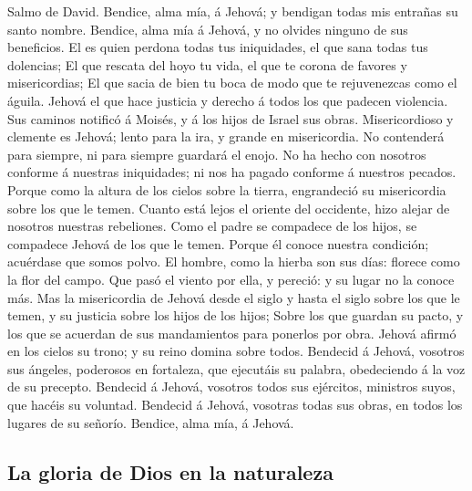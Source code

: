  Salmo de David. Bendice, alma mía, á Jehová; y bendigan
todas mis entrañas su santo nombre.  Bendice, alma mía á
Jehová, y no olvides ninguno de sus beneficios.  El es
quien perdona todas tus iniquidades, el que sana todas tus dolencias;
 El que rescata del hoyo tu vida, el que te corona de
favores y misericordias;  El que sacia de bien tu boca de
modo que te rejuvenezcas como el águila.  Jehová el que
hace justicia y derecho á todos los que padecen violencia.
 Sus caminos notificó á Moisés, y á los hijos de Israel
sus obras.  Misericordioso y clemente es Jehová; lento
para la ira, y grande en misericordia.  No contenderá para
siempre, ni para siempre guardará el enojo.  No ha hecho
con nosotros conforme á nuestras iniquidades; ni nos ha pagado conforme
á nuestros pecados.  Porque como la altura de los cielos
sobre la tierra, engrandeció su misericordia sobre los que le temen.
 Cuanto está lejos el oriente del occidente, hizo alejar
de nosotros nuestras rebeliones.  Como el padre se
compadece de los hijos, se compadece Jehová de los que le temen.
 Porque él conoce nuestra condición; acuérdase que somos
polvo.  El hombre, como la hierba son sus días: florece
como la flor del campo.  Que pasó el viento por ella, y
pereció: y su lugar no la conoce más.  Mas la
misericordia de Jehová desde el siglo y hasta el siglo sobre los que le
temen, y su justicia sobre los hijos de los hijos;  Sobre
los que guardan su pacto, y los que se acuerdan de sus mandamientos para
ponerlos por obra.  Jehová afirmó en los cielos su trono;
y su reino domina sobre todos.  Bendecid á Jehová,
vosotros sus ángeles, poderosos en fortaleza, que ejecutáis su palabra,
obedeciendo á la voz de su precepto.  Bendecid á Jehová,
vosotros todos sus ejércitos, ministros suyos, que hacéis su voluntad.
 Bendecid á Jehová, vosotras todas sus obras, en todos
los lugares de su señorío. Bendice, alma mía, á Jehová.

\hypertarget{la-gloria-de-dios-en-la-naturaleza}{%
\subsection{La gloria de Dios en la
naturaleza}\label{la-gloria-de-dios-en-la-naturaleza}}

